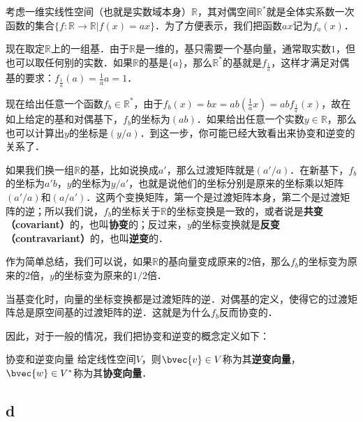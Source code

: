 \begin{example}{}
考虑一维实线性空间（也就是实数域本身）$\mathbb{R}$，其对偶空间$\mathbb{R}^*$就是全体实系数一次函数的集合$\{f:\mathbb{R}\rightarrow\mathbb{R}|f(x)=ax\}$．为了方便表示，我们把函数$ax$记为$f_a(x)$．

现在取定$\mathbb{R}$上的一组基．由于$\mathbb{R}$是一维的，基只需要一个基向量，通常取实数$1$，但也可以取任何别的实数．如果$\mathbb{R}$的基是$\{a\}$，那么$\mathbb{R}^*$的基就是$f_{\frac{1}{a}}$，这样才满足对偶基的要求：$f_{\frac{1}{a}}(a)=\frac{1}{a}a=1$．

现在给出任意一个函数$f_b\in\mathbb{R}^*$，由于$f_b(x)=bx=ab(\frac{1}{a}x)=abf_{\frac{1}{a}}(x)$，故在如上给定的基和对偶基下，$f_b$的坐标为$(ab)$．如果给出任意一个实数$y\in\mathbb{R}$，那么也可以计算出$y$的坐标是$(y/a)$．到这一步，你可能已经大致看出来协变和逆变的关系了．

如果我们换一组$\mathbb{R}$的基，比如说换成$a'$，那么过渡矩阵就是$(a'/a)$．在新基下，$f_b$的坐标为$a'b$，$y$的坐标为$y/a'$，也就是说他们的坐标分别是原来的坐标乘以矩阵$(a'/a)$和$(a/a')$．这两个变换矩阵，第一个是过渡矩阵本身，第二个是过渡矩阵的逆；所以我们说，$f_b$的坐标关于$\mathbb{R}$的坐标变换是一致的，或者说是\textbf{共变（covariant）}的，也叫\textbf{协变}的；反过来，$y$的坐标变换就是\textbf{反变（contravariant）}的，也叫\textbf{逆变}的．

作为简单总结，我们可以说，如果$\mathbb{R}$的基向量变成原来的$2$倍，那么$f_b$的坐标变为原来的$2$倍，$y$的坐标变为原来的$1/2$倍．
\end{example}

当基变化时，向量的坐标变换都是过渡矩阵的逆．对偶基的定义，使得它的过渡矩阵总是原空间基的过渡矩阵的逆．这就是为什么$f_b$反而协变的．

因此，对于一般的情况，我们把协变和逆变的概念定义如下：

\begin{definition}{协变和逆变向量}
给定线性空间$V$，则$\bvec{v}\in V$称为其\textbf{逆变向量}，$\bvec{w}\in V^*$称为其\textbf{协变向量}．
\end{definition}

\subsection{d }










